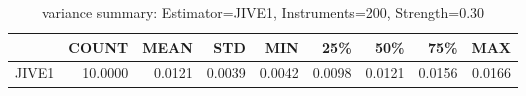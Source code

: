 \begin{table}[ht]
\centering
\caption{variance summary: Estimator=JIVE1, Instruments=200, Strength=0.30}
\begin{tabular}{lrrrrrrrr}
\toprule
 & COUNT & MEAN & STD & MIN & 25\% & 50\% & 75\% & MAX \\
\midrule
JIVE1 & 10.0000 & 0.0121 & 0.0039 & 0.0042 & 0.0098 & 0.0121 & 0.0156 & 0.0166 \\
\bottomrule
\end{tabular}
\end{table}
